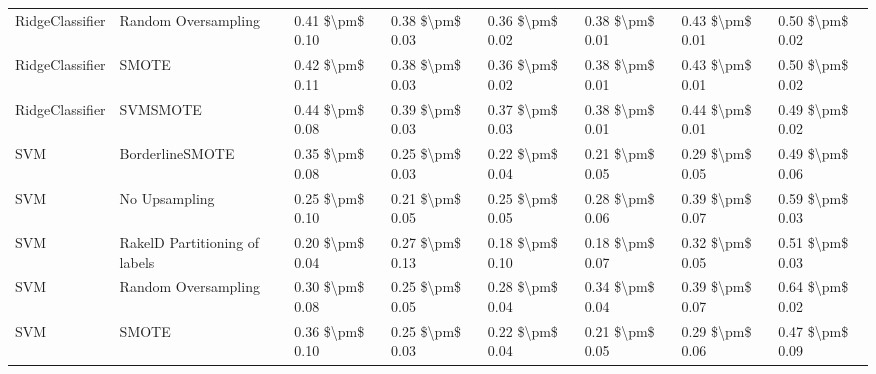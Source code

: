 \begin{tabular}{llllllll}
                RidgeClassifier &           Random Oversampling & 0.41 \$\textbackslash pm\$ 0.10 &           0.38 \$\textbackslash pm\$ 0.03 &       0.36 \$\textbackslash pm\$ 0.02 &        0.38 \$\textbackslash pm\$ 0.01 &                         0.43 \$\textbackslash pm\$ 0.01 & 0.50 \$\textbackslash pm\$ 0.02 \\
                RidgeClassifier &                         SMOTE & 0.42 \$\textbackslash pm\$ 0.11 &           0.38 \$\textbackslash pm\$ 0.03 &       0.36 \$\textbackslash pm\$ 0.02 &        0.38 \$\textbackslash pm\$ 0.01 &                         0.43 \$\textbackslash pm\$ 0.01 & 0.50 \$\textbackslash pm\$ 0.02 \\
                RidgeClassifier &                      SVMSMOTE & 0.44 \$\textbackslash pm\$ 0.08 &           0.39 \$\textbackslash pm\$ 0.03 &       0.37 \$\textbackslash pm\$ 0.03 &        0.38 \$\textbackslash pm\$ 0.01 &                         0.44 \$\textbackslash pm\$ 0.01 & 0.49 \$\textbackslash pm\$ 0.02 \\
                            SVM &               BorderlineSMOTE & 0.35 \$\textbackslash pm\$ 0.08 &           0.25 \$\textbackslash pm\$ 0.03 &       0.22 \$\textbackslash pm\$ 0.04 &        0.21 \$\textbackslash pm\$ 0.05 &                         0.29 \$\textbackslash pm\$ 0.05 & 0.49 \$\textbackslash pm\$ 0.06 \\
                            SVM &                 No Upsampling & 0.25 \$\textbackslash pm\$ 0.10 &           0.21 \$\textbackslash pm\$ 0.05 &       0.25 \$\textbackslash pm\$ 0.05 &        0.28 \$\textbackslash pm\$ 0.06 &                         0.39 \$\textbackslash pm\$ 0.07 & 0.59 \$\textbackslash pm\$ 0.03 \\
                            SVM & RakelD Partitioning of labels & 0.20 \$\textbackslash pm\$ 0.04 &           0.27 \$\textbackslash pm\$ 0.13 &       0.18 \$\textbackslash pm\$ 0.10 &        0.18 \$\textbackslash pm\$ 0.07 &                         0.32 \$\textbackslash pm\$ 0.05 & 0.51 \$\textbackslash pm\$ 0.03 \\
                            SVM &           Random Oversampling & 0.30 \$\textbackslash pm\$ 0.08 &           0.25 \$\textbackslash pm\$ 0.05 &       0.28 \$\textbackslash pm\$ 0.04 &        0.34 \$\textbackslash pm\$ 0.04 &                         0.39 \$\textbackslash pm\$ 0.07 & 0.64 \$\textbackslash pm\$ 0.02 \\
                            SVM &                         SMOTE & 0.36 \$\textbackslash pm\$ 0.10 &           0.25 \$\textbackslash pm\$ 0.03 &       0.22 \$\textbackslash pm\$ 0.04 &        0.21 \$\textbackslash pm\$ 0.05 &                         0.29 \$\textbackslash pm\$ 0.06 & 0.47 \$\textbackslash pm\$ 0.09 \\

\end{tabular}
